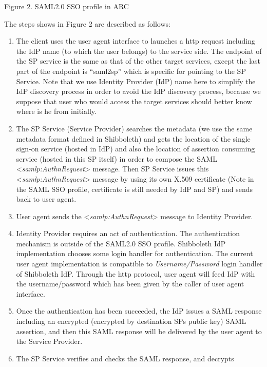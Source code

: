 \documentclass{article}
\newcommand\liststyleLiv{%
\renewcommand\theenumi{\arabic{enumi}}
\renewcommand\theenumii{\arabic{enumii}}
\renewcommand\theenumiii{\arabic{enumiii}}
\renewcommand\theenumiv{\arabic{enumiv}}
\renewcommand\labelenumi{\theenumi.}
\renewcommand\labelenumii{\theenumii.}
\renewcommand\labelenumiii{\theenumiii.}
\renewcommand\labelenumiv{\theenumiv.}
}
\begin{document}
\bigskip

{\centering
Figure 2. SAML2.0 SSO profile in ARC
\par}

The steps shows in Figure 2 are described as follows:

\liststyleLiv
\begin{enumerate}
\item The client uses the user agent interface to launches a http
request including the IdP name (to which the user belongs) to the
service side. The endpoint of the SP service is the same as that of the
other target services, except the last part of the endpoint is
{\textquotedblleft}saml2sp{\textquotedblright} which is specific for
pointing to the SP Service. Note that we use Identity Provider (IdP)
name here to simplify the IdP discovery process in order to avoid the
IdP discovery process, because we suppose that user who would access
the target services should better know where is he from initially.
\item The SP Service (Service Provider) searches the metadata (we use
the same metadata format defined in Shibboleth) and gets the location
of the single sign-on service (hosted in IdP) and also the location of
assertion consuming service (hosted in this SP itself) in order to
compose the SAML {\textless}\textit{samlp:AuthnRequest}{\textgreater}
message. Then SP Service issues this
{\textless}\textit{samlp:AuthnRequest}{\textgreater} message by using
its own X.509 certificate (Note in the SAML SSO profile, certificate is
still needed by IdP and SP) and sends back to user agent.
\item User agent sends the
{\textless}\textit{samlp:AuthnRequest}{\textgreater} message to
Identity Provider.
\item Identity Provider requires an act of authentication. The
authentication mechanism is outside of the SAML2.0 SSO profile.
Shibboleth IdP implementation chooses some login handler for
authentication. The current user agent implementation is compatible to
\textit{Username/Password} login handler of Shibboleth IdP. Through the
http protocol, user agent will feed IdP with the username/password
which has been given by the caller of user agent interface.
\item Once the authentication has been succeeded, the IdP issues a SAML
response including an encrypted (encrypted by destination
SP{\textquotesingle}s public key) SAML assertion, and then this SAML
response will be delivered by the user agent to the Service Provider. 
\item The SP Service verifies and checks the SAML response, and decrypts

\end{enumerate}
\end{document}
